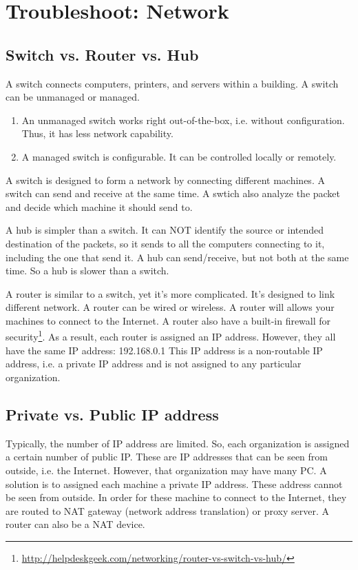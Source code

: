 \chapter{Troubleshoot: Network}
\label{chap:troubleshoot_network}

\section{Switch vs. Router vs. Hub}

A switch connects computers, printers, and servers within a building. A switch
can be unmanaged or managed. 
\begin{enumerate}
  \item An unmanaged switch works right out-of-the-box, i.e. without
  configuration. Thus, it has less network capability.
  \item A managed switch is configurable. It can be controlled locally or
  remotely. 
\end{enumerate}
A switch is designed to form a network by connecting different machines. A
switch can send and receive at the same time. A swtich also analyze the packet
and decide which machine it should send to.

A hub is simpler than a switch. It can NOT identify the source or intended
destination of the packets, so it sends to all the computers connecting to it,
including the one that send it. A hub can send/receive, but not both at the same
time. So a hub is slower than a switch. 

A router is similar to a switch, yet it's more complicated. It's designed to
link different network. A router can be wired or wireless. A router will allows
your machines to connect to the Internet. A router also have a built-in firewall
for
security\footnote{\url{http://helpdeskgeek.com/networking/router-vs-switch-vs-hub/}}.
As a result, each router is assigned an IP address. However, they all have the
same IP address: 192.168.0.1 This IP address is a non-routable IP address, i.e.
a private IP address and is not assigned to any particular organization. 

\section{Private vs. Public IP address}

Typically, the number of IP address are limited. So, each organization is
assigned a certain number of public IP. These are IP addresses that can be seen
from outside, i.e. the Internet. However, that organization may have many PC. A
solution is to assigned each machine a private IP address. These address cannot
be seen from outside. In order for these machine to connect to the Internet,
they are routed to NAT gateway (network address translation) or proxy server. A
router can also be a NAT device. 

